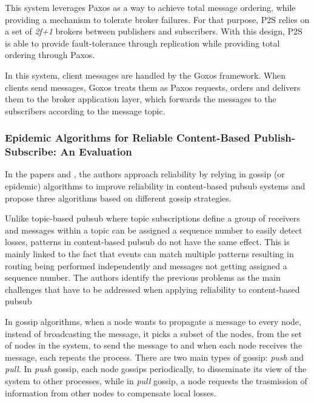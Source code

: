 This system leverages Paxos as a way to achieve total message ordering, while providing a mechanism to tolerate broker failures. For that purpose, P2S relies on a set of \textit{2f+1} brokers between publishers and subscribers. With this design, P2S is able to provide fault-tolerance through replication while providing total ordering through Paxos.

In this system, client messages are handled by the Goxos framework. When clients send messages, Goxos treats them as Paxos requests, orders and delivers them to the broker application layer, which forwards the messages to the subscribers according to the message topic.

\subsubsection{Epidemic Algorithms for Reliable Content-Based Publish-Subscribe: An Evaluation}

In the papers \cite{epidemic-algs-for-pubsub} and \cite{intro-epidemic-algs-for-pubsub}, the authors approach reliability by relying in gossip (or epidemic) algorithms to improve reliability in content-based \gls{pubsub} systems and propose three algorithms based on different gossip strategies.

Unlike topic-based \gls{pubsub} where topic subscriptions define a group of receivers and messages within a topic can be assigned a sequence number to easily detect losses, patterns in content-based \gls{pubsub} do not have the same effect. This is mainly linked to the fact that events can match multiple patterns resulting in routing being performed independently and messages not getting assigned a sequence number. The authors identify the previous problems as the main challenges that have to be addressed when applying reliability to content-based \gls{pubsub}

In gossip algorithms, when a node wants to propagate a message to every node, instead of broadcasting the message, it picks a subset of the nodes, from the set of nodes in the system, to send the message to and when each node receives the message, each repeats the process. There are two main types of gossip: \textit{push} and \textit{pull}. In \textit{push} gossip, each node gossips periodically, to disseminate its view of the system to other processes, while in \textit{pull} gossip, a node requests the trasmission of information from other nodes to compensate local losses.

